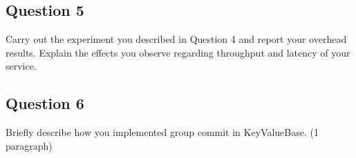 \documentclass[12pt,a4paper]{article}
\begin{document}
\subsection*{Question 5}
\label{sec:pq5}
Carry out the experiment you described in Question 4 and report your overhead results.
Explain the effects you observe regarding throughput and latency of your service.


\subsection*{Question 6}
\label{sec:pq6}

Briefly describe how you implemented group commit in KeyValueBase. (1 paragraph)



 
\begin{thebibliography}{1}


\end{thebibliography}
\end{document}
